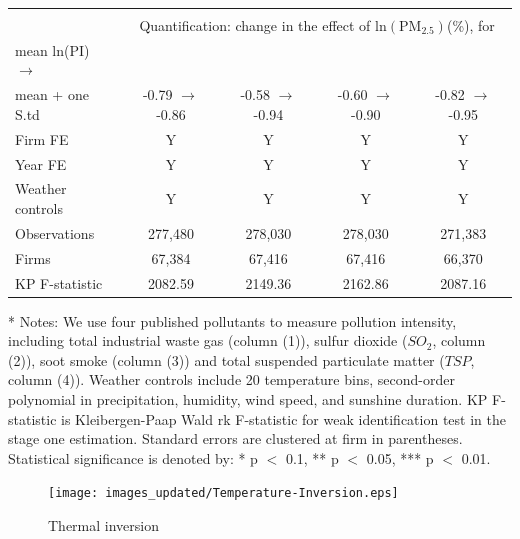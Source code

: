 \documentclass[12pt]{article}
\begin{document}
\begin{table}[H]
\begin{tabular}{l*{4}{c}}
                           &&&&\\
                           &\multicolumn{4}{c}{Quantification: change in the effect of $\mathrm{ln(PM_{2.5})}$(\%), for}\\ 
        mean  ln(PI) $\rightarrow$       &&&&\\ 
        mean + one S.td        &-0.79  $\rightarrow$ -0.86 &	-0.58 $\rightarrow$ -0.94 &  -0.60 $\rightarrow$ -0.90 & -0.82 $\rightarrow$ -0.95\\
        \hline
        Firm FE &Y&Y&Y&Y\\
        Year FE &Y&Y&Y&Y\\
        Weather controls &Y&Y&Y&Y\\
        \hline
        Observations 	         &277,480 &	278,030 &	278,030&	271,383 \\
        Firms	                 &67,384	& 67,416	& 67,416 &	66,370  \\
        KP F-statistic	       &2082.59 &	2149.36 &	2162.86&	2087.16 \\
        \hline\hline
    \end{tabular}
    \begin{tablenotes}
      \item[*] \small Notes: We use four published pollutants to measure pollution intensity, including total industrial waste gas
      (column (1)), sulfur dioxide ($SO_{2}$, column (2)), soot smoke (column (3)) and total suspended particulate
      matter ($TSP$, column (4)). Weather controls include 20 temperature bins, second-order polynomial in precipitation, humidity, wind speed, and sunshine duration. KP F-statistic is Kleibergen-Paap Wald rk F-statistic for weak identification test in the stage one estimation. Standard errors are clustered at firm in parentheses. Statistical significance is denoted by: * p $<$ 0.1, ** p $<$ 0.05, *** p $<$ 0.01.
    \end{tablenotes}
    
    \end{table}

  

\newpage
\begin{figure}[H]
  \caption{Thermal inversion\protect\footnotemark} \label{fig:1}
  \centering \texttt{[image: images\_updated/Temperature-Inversion.eps]}
\end{figure}
\end{document}
